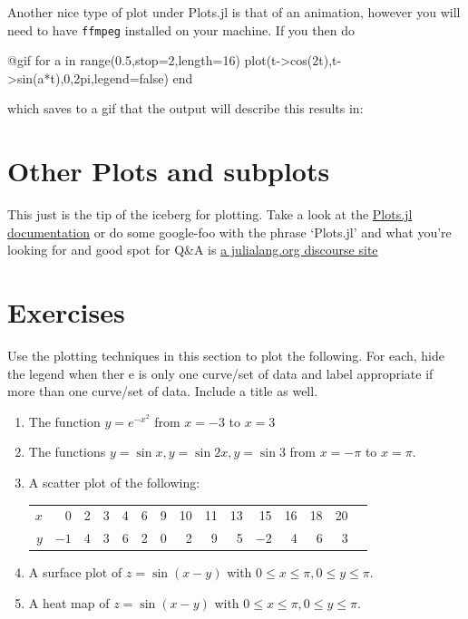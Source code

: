 Another nice type of plot under Plots.jl is that of an animation,
however you will need to have \texttt{ffmpeg} installed on your machine.
If you then do

\begin{jlverbatim}
@gif for a in range(0.5,stop=2,length=16)
  plot(t->cos(2t),t->sin(a*t),0,2pi,legend=false)
end
\end{jlverbatim}

which saves to a gif that the output will describe this results in:



\section{Other Plots and subplots}

This just is the tip of the iceberg for plotting. Take a look at the
\href{http://docs.juliaplots.org/latest/}{Plots.jl documentation} or do
some google-foo with the phrase `Plots.jl' and what you're looking for
and good spot for Q\&A is
\href{https://discourse.julialang.org/c/domain/viz}{a julialang.org
discourse site}

\section{Exercises}

Use the plotting techniques in this section to plot the following.  For each, hide the legend when ther e is only one curve/set of data and label appropriate if more than one curve/set of data.  Include a title as well. 

\begin{enumerate}
\item The function $y=e^{-x^2}$ from $x=-3$ to $x=3$
\item The functions $y=\sin x, y=\sin 2x, y=\sin 3$ from $x=-\pi$ to $x=\pi$. 
\item A scatter plot of the following:
\begin{center}
\begin{tabular}{r|rrrrrrrrrrrrrr}
$x$ & 0 & 2 & 3 & 4 & 6 & 9 & 10 & 11 & 13 & 15 & 16 & 18 & 20 \\
$y$ & $-1$ & 4 & 3 & 6 & 2 & 0 & 2 & 9 & 5 & $-2$ & 4 & 6 & 3\\
\end{tabular}
\end{center}
\item A surface plot of $z=\sin(x-y)$ with $0 \leq x \leq \pi, 0 \leq y \leq \pi$.
\item A heat map of $z=\sin(x-y)$ with $0 \leq x \leq \pi, 0 \leq y \leq \pi$.
\end{enumerate}
